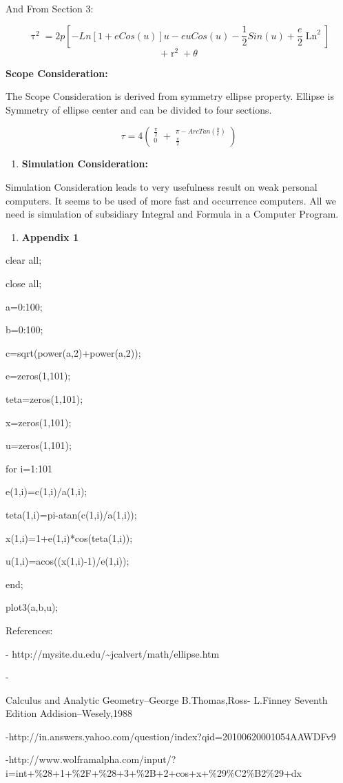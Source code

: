 \documentclass{article}
\begin{document}
\noindent And From Section 3:

\noindent 
\[\mathop{\tau }\nolimits^{2} =2p\left[-Ln\left[1+eCos(u)\right]u-euCos(u)-\frac{1}{2} Sin(u)+\frac{e}{2} \mathop{Ln[1+eCos(u)]}\nolimits^{2} \right]\] 
\[+\mathop{r}\nolimits^{2} +\theta \] 
\textbf{}

\noindent \textbf{Scope Consideration:}

\noindent The Scope Consideration is derived from symmetry ellipse property. Ellipse is Symmetry of ellipse center and can be divided to four sections.

\noindent 
\[\tau =4\left(\mathop{\left. \theta \right|}\nolimits_{0}^{\frac{\pi }{2} } +\mathop{\left. \theta \right|}\nolimits_{\frac{\pi }{2} }^{\pi -ArcTan(\frac{b}{c} )} \right)\] 

\begin{enumerate}
\item  \textbf{Simulation Consideration: }
\end{enumerate}

\noindent Simulation Consideration leads to very usefulness result on weak personal computers. It seems to be used of more fast and occurrence computers. All we need is simulation of subsidiary Integral and Formula in a Computer Program.

\begin{enumerate}
\item  \textbf{Appendix 1}
\end{enumerate}

\noindent clear all;

\noindent close all;

\noindent a=0:100;

\noindent b=0:100;

\noindent c=sqrt(power(a,2)+power(a,2));

\noindent e=zeros(1,101);

\noindent teta=zeros(1,101);

\noindent x=zeros(1,101);

\noindent u=zeros(1,101);

\noindent for i=1:101

\noindent e(1,i)=c(1,i)/a(1,i);

\noindent teta(1,i)=pi-atan(c(1,i)/a(1,i));

\noindent x(1,i)=1+e(1,i)*cos(teta(1,i));

\noindent u(1,i)=acos((x(1,i)-1)/e(1,i));

\noindent end;

\noindent plot3(a,b,u);

\noindent 

\noindent References:

\noindent [1]- http://mysite.du.edu/\~{}jcalvert/math/ellipse.htm

\noindent [2]-

\noindent Calculus and Analytic Geometry--George B.Thomas,Ross- L.Finney Seventh Edition Addision--Wesely,1988

\noindent [3]-http://in.answers.yahoo.com/question/index?qid=20100620001054AAWDFv9

\noindent [4]-http://www.wolframalpha.com/input/?i=int+\%28+1+\%2F+\%28+3+\%2B+2+cos+x+\%29\%C2\%B2\%29+dx

\noindent 
\end{document}
